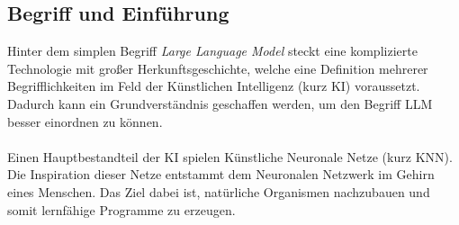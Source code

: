 \subsection{Begriff und Einführung}
Hinter dem simplen Begriff \textit{Large Language Model} steckt eine komplizierte Technologie mit großer Herkunftsgeschichte, welche eine Definition mehrerer Begrifflichkeiten im Feld der Künstlichen Intelligenz (kurz KI) voraussetzt. Dadurch kann ein Grundverständnis geschaffen werden, um den Begriff LLM besser einordnen zu können. \cite{seemannKuenstlicheIntelligenzLarge} \\\\ Einen Hauptbestandteil der KI spielen Künstliche Neuronale Netze (kurz \acs{KNN}).
Die Inspiration dieser Netze entstammt dem Neuronalen Netzwerk im Gehirn eines Menschen. \cite*{seemannKuenstlicheIntelligenzLarge} Das Ziel dabei ist, natürliche Organismen nachzubauen und somit lernfähige Programme zu erzeugen.
